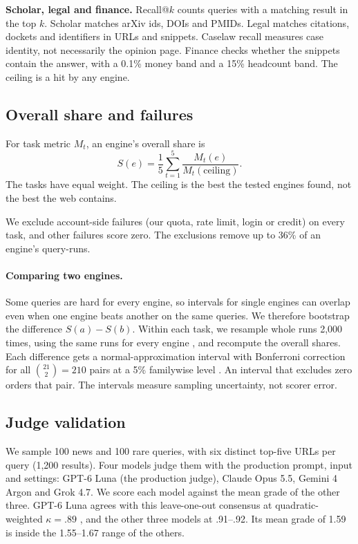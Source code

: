 \documentclass[11pt]{article}
\begin{document}
\textbf{Scholar, legal and finance.} Recall@$k$ counts queries with a
matching result in the top $k$. Scholar matches arXiv ids, DOIs and
PMIDs. Legal matches citations, dockets and identifiers in URLs and
snippets. Caselaw recall measures case identity, not necessarily the
opinion page. Finance checks whether the snippets contain the answer,
with a 0.1\% money band and a 15\% headcount band. The ceiling is a hit
by any engine.

\subsection{Overall share and failures}
\label{sec:agg}

For task metric $M_t$, an engine's overall share is
\[
S(e)=\frac{1}{5}\sum_{t=1}^{5}
\frac{M_t(e)}{M_t(\mathrm{ceiling})}.
\]
The tasks have equal weight. The ceiling is the best the tested engines
found, not the best the web contains.

We exclude account-side failures (our quota, rate limit, login or
credit) on every task, and other failures score zero. The exclusions
remove up to 36\% of an engine's query-runs.

\paragraph{Comparing two engines.}
Some queries are hard for every engine, so intervals for single engines
can overlap even when one engine beats another on the same queries. We
therefore bootstrap the difference $S(a)-S(b)$. Within each task, we
resample whole runs 2,000 times, using the same runs for every engine
\citep{efron1993bootstrap}, and recompute the overall shares. Each
difference gets a normal-approximation interval with Bonferroni
correction for all $\binom{21}{2}=210$ pairs at a 5\% familywise level
\citep{carterette2012multiple}. An interval that excludes zero orders
that pair. The intervals measure sampling uncertainty, not scorer error.

\subsection{Judge validation}
\label{sec:validation}

We sample 100 news and 100 rare queries, with six distinct top-five URLs
per query (1,200 results). Four models judge them with the production
prompt, input and settings: GPT-6 Luna (the production judge), Claude
Opus 5.5, Gemini 4 Argon and Grok 4.7. We score each model against the
mean grade of the other three. GPT-6 Luna agrees with this leave-one-out
consensus at quadratic-weighted $\kappa=.89$
\citep{cohen1968weighted}, and the other three models at .91--.92. Its mean grade
of 1.59 is inside the 1.55--1.67 range of the others.
\end{document}
